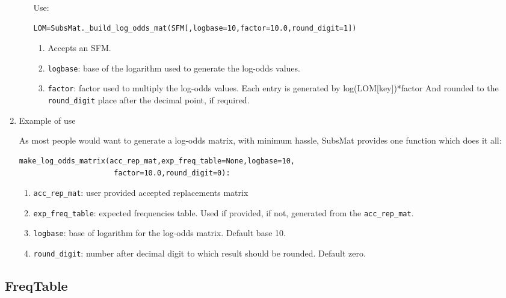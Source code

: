 \documentclass{report}
\begin{document}
\begin{enumerate}
\begin{enumerate}
   Use:
\begin{verbatim}
LOM=SubsMat._build_log_odds_mat(SFM[,logbase=10,factor=10.0,round_digit=1])
\end{verbatim}

   \begin{enumerate}
     \item Accepts an SFM.

     \item \verb|logbase|: base of the logarithm used to generate the log-odds values.

     \item \verb|factor|: factor used to multiply the log-odds values.  Each entry is generated by log(LOM[key])*factor And rounded to the \verb|round_digit| place after the decimal point, if required.

\end{enumerate}

\end{enumerate}

\item Example of use

As most people would want to generate a log-odds matrix, with minimum hassle, SubsMat provides one function which does it all:

\begin{verbatim}
make_log_odds_matrix(acc_rep_mat,exp_freq_table=None,logbase=10,
                      factor=10.0,round_digit=0):
\end{verbatim}

\begin{enumerate}
  \item \verb|acc_rep_mat|: user provided accepted replacements matrix
  \item \verb|exp_freq_table|: expected frequencies table. Used if provided, if not, generated from the \verb|acc_rep_mat|.
  \item \verb|logbase|: base of logarithm for the log-odds matrix. Default base 10.
  \item \verb|round_digit|: number after decimal digit to which result should be rounded. Default zero.
\end{enumerate}

\end{enumerate}

\subsection{FreqTable}
\label{sec:freq_table}
\end{document}
